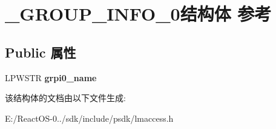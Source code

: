 \hypertarget{struct___g_r_o_u_p___i_n_f_o__0}{}\section{\+\_\+\+G\+R\+O\+U\+P\+\_\+\+I\+N\+F\+O\+\_\+0结构体 参考}
\label{struct___g_r_o_u_p___i_n_f_o__0}
\subsection*{Public 属性}
\begin{DoxyCompactItemize}
\item 
\mbox{\label{struct___g_r_o_u_p___i_n_f_o__0_a85910a38c8641a08315a1017862f0258}} 
L\+P\+W\+S\+TR {\bfseries grpi0\+\_\+name}
\end{DoxyCompactItemize}


该结构体的文档由以下文件生成\+:\begin{DoxyCompactItemize}
\item 
E\+:/\+React\+O\+S-\/0../sdk/include/psdk/lmaccess.\+h\end{DoxyCompactItemize}
